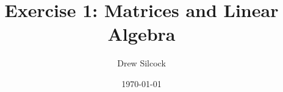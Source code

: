 \documentclass[report,aps,twocolumn]{revtex4}
\begin{document}
\title{Exercise 1: Matrices and Linear Algebra}
\author{Drew Silcock}
\date{\today}

\maketitle





\end{document}
